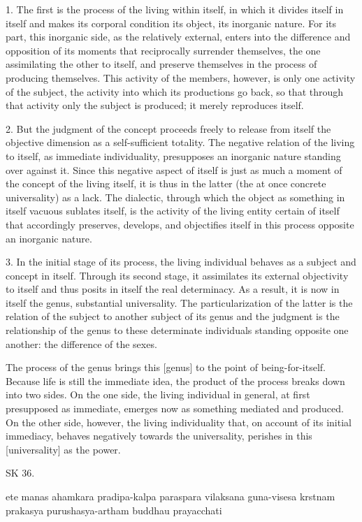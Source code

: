 1. The first is the process of the living within itself,
in which it divides itself in itself and makes its
corporal condition its object, its inorganic nature.
For its part, this inorganic side, as the relatively external,
enters into the difference and opposition of its moments that reciprocally
surrender themselves, the one assimilating the other to itself, and
preserve themselves in the process of producing themselves.
This activity of the members, however, is only one activity of
the subject, the activity into which its productions go back,
so that through that activity only the subject is produced;
it merely reproduces itself.

2. But the judgment of the concept proceeds freely to release from itself
the objective dimension as a self-sufficient totality.
The negative relation of the living to itself, as immediate individuality,
presupposes an inorganic nature standing over against it.
Since this negative aspect of itself is just as much a moment of
the concept of the living itself, it is thus in the latter
(the at once concrete universality) as a lack.
The dialectic, through which the object as something in itself vacuous sublates itself,
is the activity of the living entity certain of itself that accordingly
preserves, develops, and objectifies itself in this process opposite an inorganic nature.

3. In the initial stage of its process, the living individual
behaves as a subject and concept in itself.
Through its second stage, it assimilates its external objectivity to itself and
thus posits in itself the real determinacy.
As a result, it is now in itself the genus, substantial universality.
The particularization of the latter is the relation of
the subject to another subject of its genus and
the judgment is the relationship of the genus to these
determinate individuals standing opposite one another:
the difference of the sexes.

The process of the genus brings this [genus] to
the point of being-for-itself.
Because life is still the immediate idea,
the product of the process breaks down into two sides.
On the one side, the living individual in general,
at first presupposed as immediate,
emerges now as something mediated and produced.
On the other side, however, the living individuality that,
on account of its initial immediacy,
behaves negatively towards the universality,
perishes in this [universality] as the power.

SK 36.

ete manas ahamkara pradipa-kalpa paraspara vilaksana
guna-visesa krstnam prakasya purushasya-artham buddhau prayacchati

